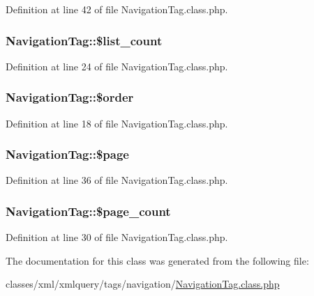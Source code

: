 Definition at line 42 of file Navigation\-Tag.\-class.\-php.

\hypertarget{classNavigationTag_a0d79757d75c3a0cfc3d38db7346349a4}{
\subsubsection[{\$list\-\_\-count}]{\setlength{\rightskip}{0pt plus 5cm}Navigation\-Tag\-::\$list\-\_\-count}}\label{classNavigationTag_a0d79757d75c3a0cfc3d38db7346349a4}


Definition at line 24 of file Navigation\-Tag.\-class.\-php.

\hypertarget{classNavigationTag_a67fea0de20a4e7bf16df396c69171799}{
\subsubsection[{\$order}]{\setlength{\rightskip}{0pt plus 5cm}Navigation\-Tag\-::\$order}}\label{classNavigationTag_a67fea0de20a4e7bf16df396c69171799}


Definition at line 18 of file Navigation\-Tag.\-class.\-php.

\hypertarget{classNavigationTag_a095ee63f01c7ae4c6e66854521c88371}{
\subsubsection[{\$page}]{\setlength{\rightskip}{0pt plus 5cm}Navigation\-Tag\-::\$page}}\label{classNavigationTag_a095ee63f01c7ae4c6e66854521c88371}


Definition at line 36 of file Navigation\-Tag.\-class.\-php.

\hypertarget{classNavigationTag_a1aaaffcb475c1edc0a93539c59a92ce9}{
\subsubsection[{\$page\-\_\-count}]{\setlength{\rightskip}{0pt plus 5cm}Navigation\-Tag\-::\$page\-\_\-count}}\label{classNavigationTag_a1aaaffcb475c1edc0a93539c59a92ce9}


Definition at line 30 of file Navigation\-Tag.\-class.\-php.



The documentation for this class was generated from the following file\-:\begin{DoxyCompactItemize}
\item 
classes/xml/xmlquery/tags/navigation/\hyperlink{NavigationTag_8class_8php}{Navigation\-Tag.\-class.\-php}\end{DoxyCompactItemize}
